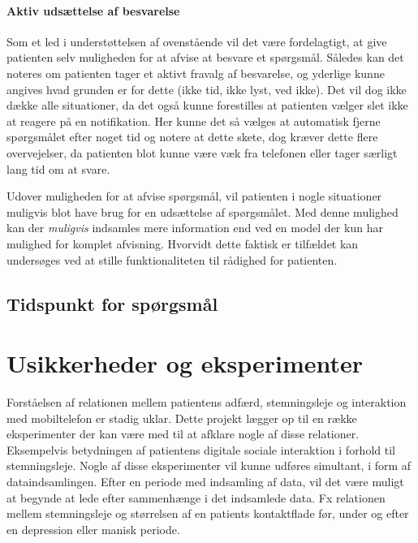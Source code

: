 \paragraph{Aktiv udsættelse af besvarelse}
Som et led i understøttelsen af ovenstående vil det være fordelagtigt, at give patienten selv muligheden for at afvise at besvare et spørgsmål.
Således kan det noteres om patienten tager et aktivt fravalg af besvarelse, og yderlige kunne angives hvad grunden er for dette (ikke tid, ikke lyst, ved ikke).
Det vil dog ikke dække alle situationer, da det også kunne forestilles at patienten vælger slet ikke at reagere på en notifikation.
Her kunne det så vælges at automatisk fjerne spørgsmålet efter noget tid og notere at dette skete, dog kræver dette flere overvejelser, da patienten blot kunne være væk fra telefonen eller tager særligt lang tid om at svare.

Udover muligheden for at afvise spørgsmål, vil patienten i nogle situationer muligvis blot have brug for en udsættelse af spørgsmålet.
Med denne mulighed kan der \textit{muligvis} indsamles mere information end ved en model der kun har mulighed for komplet afvisning.
Hvorvidt dette faktisk er tilfældet kan undersøges ved at stille funktionaliteten til rådighed for patienten.

\subsection{Tidspunkt for spørgsmål}


\section{Usikkerheder og eksperimenter}
Forståelsen af relationen mellem patientens adfærd, stemningsleje og interaktion med mobiltelefon er stadig uklar.
Dette projekt lægger op til en række eksperimenter der kan være med til at afklare nogle af disse relationer.
Eksempelvis betydningen af patientens digitale sociale interaktion i forhold til stemningsleje.
Nogle af disse eksperimenter vil kunne udføres simultant, i form af dataindsamlingen.
Efter en periode med indsamling af data, vil det være muligt at begynde at lede efter sammenhænge i det indsamlede data.
Fx relationen mellem stemningsleje og størrelsen af en patients kontaktflade før, under og efter en depression eller manisk periode.

